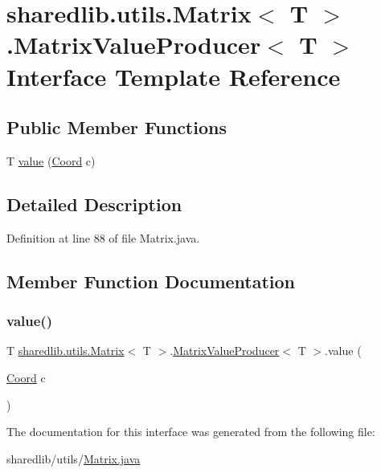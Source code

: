 \hypertarget{interfacesharedlib_1_1utils_1_1_matrix_1_1_matrix_value_producer}{}\section{sharedlib.\+utils.\+Matrix$<$ T $>$.Matrix\+Value\+Producer$<$ T $>$ Interface Template Reference}
\label{interfacesharedlib_1_1utils_1_1_matrix_1_1_matrix_value_producer}
\subsection*{Public Member Functions}
\begin{DoxyCompactItemize}
\item 
T \hyperlink{interfacesharedlib_1_1utils_1_1_matrix_1_1_matrix_value_producer_a0e4cdf204c4bcd42c844ec6bc927fb49}{value} (\hyperlink{classsharedlib_1_1utils_1_1_coord}{Coord} c)
\end{DoxyCompactItemize}


\subsection{Detailed Description}


Definition at line 88 of file Matrix.\+java.



\subsection{Member Function Documentation}
\hypertarget{interfacesharedlib_1_1utils_1_1_matrix_1_1_matrix_value_producer_a0e4cdf204c4bcd42c844ec6bc927fb49}{}\label{interfacesharedlib_1_1utils_1_1_matrix_1_1_matrix_value_producer_a0e4cdf204c4bcd42c844ec6bc927fb49} 
\subsubsection{\texorpdfstring{value()}{value()}}
{\footnotesize\ttfamily T \hyperlink{classsharedlib_1_1utils_1_1_matrix}{sharedlib.\+utils.\+Matrix}$<$ T $>$.\hyperlink{interfacesharedlib_1_1utils_1_1_matrix_1_1_matrix_value_producer}{Matrix\+Value\+Producer}$<$ T $>$.value (\begin{DoxyParamCaption}\item[{\hyperlink{classsharedlib_1_1utils_1_1_coord}{Coord}}]{c }\end{DoxyParamCaption})}



The documentation for this interface was generated from the following file\+:\begin{DoxyCompactItemize}
\item 
sharedlib/utils/\hyperlink{_matrix_8java}{Matrix.\+java}\end{DoxyCompactItemize}
